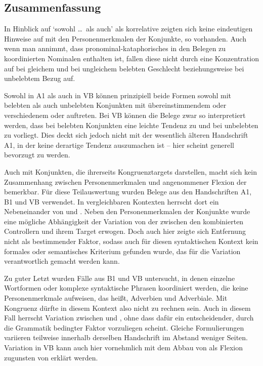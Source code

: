 
\subsection{Zusammenfassung}

In Hinblick auf  `sowohl \dots\ als auch' als
korrelative  zeigten sich keine eindeutigen
Hinweise auf  mit den Personenmerkmalen der
Konjunkte, so vorhanden. Auch wenn man annimmt, dass
pronominal-kataphorisches  in den Belegen zu
koordinierten Nominalen enthalten ist, fallen diese nicht
durch eine Konzentration auf  bei gleichem und  bei
ungleichem belebten Geschlecht beziehungsweise bei
unbelebtem Bezug auf.

Sowohl in A1 als auch in VB können prinzipiell beide Formen sowohl mit
belebten als auch unbelebten Konjunkten mit
über\-einstim\-mendem oder verschiedenem  oder 
auftreten. Bei VB können die Belege zwar so interpretiert werden, dass bei
belebten Konjunkten eine leichte Tendenz zu  und bei
unbelebten zu  vorliegt. Dies deckt
sich jedoch nicht mit der wesentlich älteren Handschrift A1, in
der keine derartige Tendenz auszumachen ist -- hier scheint generell
 bevorzugt zu werden.

Auch mit Konjunkten, die ihrerseits Kongruenztargets darstellen,
macht sich kein Zusammen\-hang zwischen Personen\-merkmalen
und angenommener Flexion der  bemerkbar. Für diese
Teilauswertung wurden Belege aus den Handschriften A1, B1 und VB verwendet. In
vergleichbaren Kontexten herrscht dort ein Nebeneinander von  und
. Neben den Personenmerkmalen der Konjunkte
wurde eine mögliche Abhängigkeit der Variation von der  zwischen
den kombinierten Controllern und ihrem Target erwogen. Doch auch
hier zeigte sich Entfernung nicht als bestimmender Faktor, sodass auch für
diesen syntaktischen Kontext kein formales oder semantisches Kriterium gefunden
wurde, das für die Variation verantwortlich gemacht werden kann.

Zu guter Letzt wurden Fälle aus B1 und VB untersucht, in denen einzelne
Wortformen oder komplexe syntaktische Phrasen koordiniert
werden, die keine Personenmerkmale aufweisen, das heißt,
Adverbien und Adverbiale. Mit Kongruenz dürfte in
diesem Kontext also nicht zu rechnen sein. Auch in diesem Fall herrscht
Variation zwischen  und , ohne dass dafür ein
entscheidender, durch die Grammatik bedingter Faktor vorzuliegen scheint.
Gleiche Formulierungen variieren teilweise innerhalb derselben Handschrift im
Abstand weniger Seiten. Variation in VB kann auch hier vornehmlich mit dem
Abbau von  als Flexion zugunsten von  erklärt werden.
